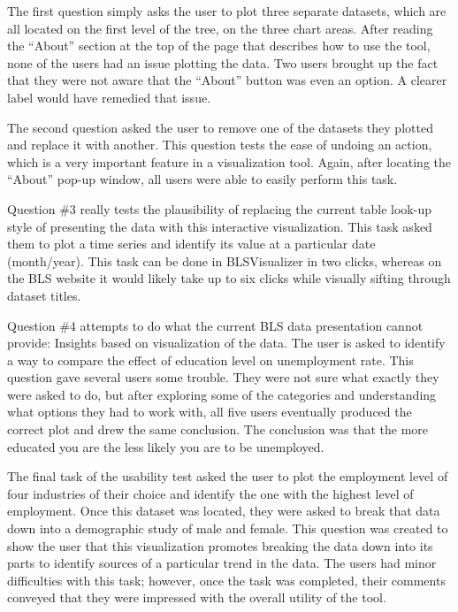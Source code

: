 \documentclass{sigchi}
\begin{document}
The first question simply asks the user to plot three separate datasets, which are all located on the first level of the tree, on the three chart areas. After reading the ``About'' section at the top of the page that describes how to use the tool, none of the users had an issue plotting the data. Two users brought up the fact that they were not aware that the ``About'' button was even an option. A clearer label would have remedied that issue.

The second question asked the user to remove one of the datasets they plotted and replace it with another. This question tests the ease of undoing an action, which is a very important feature in a visualization tool. Again, after locating the ``About'' pop-up window, all users were able to easily perform this task.

Question \#3 really tests the plausibility of replacing the current table look-up style of presenting the data with this interactive visualization. This task asked them to plot a time series and identify its value at a particular date (month/year). This task can be done in BLSVisualizer in two clicks, whereas on the BLS website it would likely take up to six clicks while visually sifting through dataset titles.

Question \#4 attempts to do what the current BLS data presentation cannot provide: Insights based on visualization of the data. The user is asked to identify a way to compare the effect of education level on unemployment rate. This question gave several users some trouble. They were not sure what exactly they were asked to do, but after exploring some of the categories and understanding what options they had to work with, all five users eventually produced the correct plot and drew the same conclusion. The conclusion was that the more educated you are the less likely you are to be unemployed.

The final task of the usability test asked the user to plot the employment level of four industries of their choice and identify the one with the highest level of employment. Once this dataset was located, they were asked to break that data down into a demographic study of male and female. This question was created to show the user that this visualization promotes breaking the data down into its parts to identify sources of a particular trend in the data. The users had minor difficulties with this task; however, once the task was completed, their comments conveyed that they were impressed with the overall utility of the tool.
\end{document}
